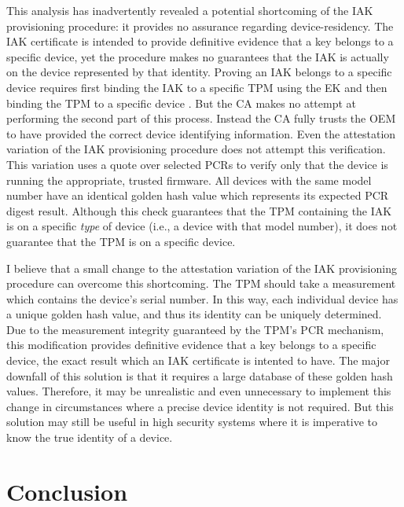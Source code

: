 \documentclass[runningheads]{llncs}
\begin{document}
This analysis has inadvertently revealed a potential shortcoming of the IAK provisioning procedure: it provides no assurance regarding device-residency.
The IAK certificate is intended to provide definitive evidence that a key belongs to a specific device, yet the procedure makes no guarantees that the IAK is actually on the device represented by that identity.
Proving an IAK belongs to a specific device requires first binding the IAK to a specific TPM using the EK and then binding the TPM to a specific device \citep{DevIDSpec-TCG}. 
But the CA makes no attempt at performing the second part of this process. Instead the CA fully trusts the OEM to have provided the correct device identifying information. 
Even the attestation variation of the IAK provisioning procedure does not attempt this verification. This variation uses a quote over selected PCRs to verify only that the device is running the appropriate, trusted firmware. All devices with the same model number have an identical golden hash value which represents its expected PCR digest result.
Although this check guarantees that the TPM containing the IAK is on a specific \textit{type} of device (i.e., a device with that model number), it does not guarantee that the TPM is on a specific device. 

I believe that a small change to the attestation variation of the IAK provisioning procedure can overcome this shortcoming. The TPM should take a measurement which contains the device's serial number. In this way, each individual device has a unique golden hash value, and thus its identity can be uniquely determined.
Due to the measurement integrity guaranteed by the TPM's PCR mechanism, this modification provides definitive evidence that a key belongs to a specific 
device, the exact result which an IAK certificate is intented to have. The major downfall of this solution is that it requires a large database of these golden hash values. Therefore, it may be unrealistic and even unnecessary to implement this change in circumstances where a precise device identity is not required. But this solution may still be useful in high security systems where it is imperative to know the true identity of a device.
%
%
%
\section{Conclusion}
\end{document}
